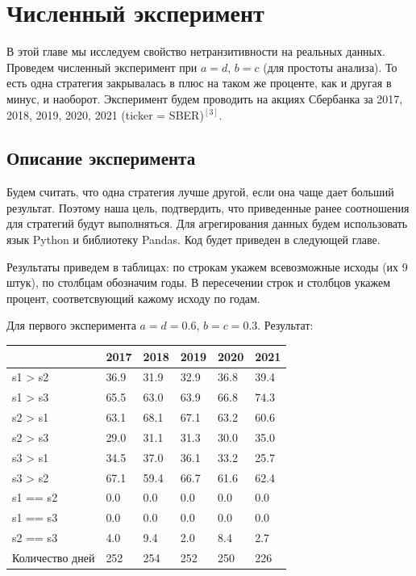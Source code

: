 \chapter{Численный эксперимент}

В этой главе мы исследуем свойство нетранзитивности на реальных данных. Проведем численный эксперимент при $a = d$, $b = c$ (для простоты анализа).
То есть одна стратегия закрывалась в плюс на таком же проценте, как и другая в минус, и наоборот. Эксперимент будем проводить на акциях Сбербанка за 2017, 2018, 2019, 2020, 2021 (ticker = SBER)$^{[3]}$.
\section{Описание эксперимента}

Будем считать, что одна стратегия лучше другой, если она чаще дает больший результат. Поэтому наша цель, подтвердить, что приведенные ранее соотношения для стратегий будут выполняться. Для агрегирования данных будем использовать язык Python и библиотеку Pandas. Код будет приведен в следующей главе.
\smallskip
\smallskip

Результаты приведем в таблицах: по строкам укажем всевозможные исходы (их 9 штук), по столбцам обозначим годы. В пересечении строк и столбцов укажем процент, соответсвующий кажому исходу по годам.
\smallskip
\smallskip

Для первого эксперимента $a = d = 0.6$, $b = c = 0.3$. Результат:

\begin{table}[!ht]
\centering
\begin{tabular}{|l|l|l|l|l|l|}
\hline
     & 2017 & 2018 & 2019 & 2020 & 2021 \\ \hline
    s1 > s2 & 36.9 & 31.9 & 32.9 & 36.8 & 39.4 \\ \hline
    \rowcolor{blue}s1 > s3 & 65.5 & 63.0 & 63.9 & 66.8 & 74.3 \\ \hline
    \rowcolor{blue}s2 > s1 & 63.1 & 68.1 & 67.1 & 63.2 & 60.6 \\ \hline
    s2 > s3 & 29.0 & 31.1 & 31.3 & 30.0 & 35.0 \\ \hline
    s3 > s1 & 34.5 & 37.0 & 36.1 & 33.2 & 25.7 \\ \hline
    \rowcolor{blue}s3 > s2 & 67.1 & 59.4 & 66.7 & 61.6 & 62.4 \\ \hline
    s1 == s2 & 0.0 & 0.0 & 0.0 & 0.0 & 0.0 \\ \hline
    s1 == s3 & 0.0 & 0.0 & 0.0 & 0.0 & 0.0 \\ \hline
    s2 == s3 & 4.0 & 9.4 & 2.0 & 8.4 & 2.7 \\ \hline
    Количество дней & 252 & 254 & 252 & 250 & 226 \\ \hline
\end{tabular}
\end{table}

